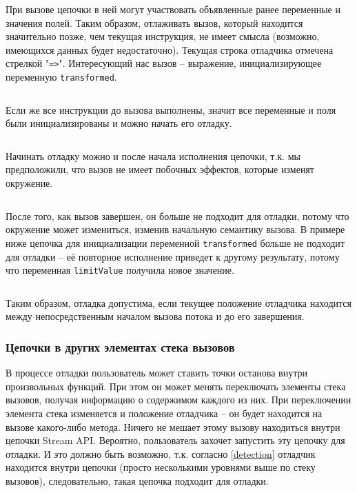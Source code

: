 При вызове цепочки в ней могут участвовать объявленные ранее переменные и значения полей. Таким образом, отлаживать вызов, который находится значительно позже, чем текущая инструкция, не имеет смысла (возможно, имеющихся данных будет недостаточно). Текущая строка отладчика отмечена стрелкой "\texttt{=>}". Интересующий нас вызов -- выражение, инициализирующее переменную \texttt{transformed}.

\inputminted{java}{chapter2/code/FarToCall.java}

Если же все инструкции до вызова выполнены, значит все переменные и поля были инициализированы и можно начать его отладку. 

\inputminted{java}{chapter2/code/BeforeCall.java}

Начинать отладку можно и после начала исполнения цепочки, т.к. мы предположили, что вызов не имеет побочных эффектов, которые изменят окружение.
\inputminted{java}{chapter2/code/InEvaluation.java}

После того, как вызов завершен, он больше не подходит для отладки, потому что окружение может измениться, изменив начальную семантику вызова. В примере ниже цепочка для инициализации переменной \texttt{transformed} больше не подходит для отладки -- её повторное исполнение приведет к другому результату, потому что переменная \texttt{limitValue} получила новое значение.
\inputminted{java}{chapter2/code/AfterCall.java}

Таким образом, отладка допустима, если текущее положение отладчика находится между непосредственным началом вызова потока и до его завершения.

\subsubsection{Цепочки в других элементах стека вызовов}
В процессе отладки пользователь может ставить точки останова внутри произвольных функций. При этом он может менять переключать элементы стека вызовов, получая информацию о содержимом каждого из них. При переключении элемента стека изменяется и положение отладчика -- он будет находится на вызове какого-либо метода. Ничего не мешает этому вызову находиться внутри цепочки Stream API. Вероятно, пользователь захочет запустить эту цепочку для отладки. И это должно быть возможно, т.к. согласно \ref{detection} отладчик находится внутри цепочки (просто несколькими уровнями выше по стеку вызовов), следовательно, такая цепочка подходит для отладки.
\inputminted{java}{chapter2/code/NestedMethod.java}

